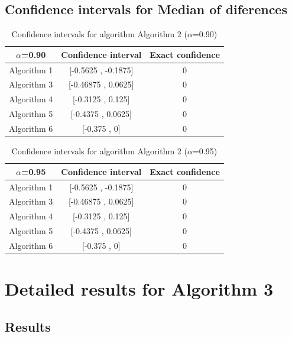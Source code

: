 \documentclass[a4paper,10pt]{article}
\begin{document}
\subsection{Confidence intervals for Median of diferences}

\begin{table}[!htp]
\centering\small
\begin{tabular}{
|c|c|c|}
\hline
 $\alpha$=0.90 & Confidence interval & Exact confidence \\ \hline 
Algorithm 1 & [-0.5625 , -0.1875] & 0\\ \hline 
Algorithm 3 & [-0.46875 , 0.0625] & 0\\ \hline 
Algorithm 4 & [-0.3125 , 0.125] & 0\\ \hline 
Algorithm 5 & [-0.4375 , 0.0625] & 0\\ \hline 
Algorithm 6 & [-0.375 , 0] & 0\\ \hline 

\end{tabular}
\caption{Confidence intervals for algorithm Algorithm 2 ($\alpha$=0.90)}
\end{table}
\begin{table}[!htp]
\centering\small
\begin{tabular}{
|c|c|c|}
\hline
 $\alpha$=0.95 & Confidence interval & Exact confidence \\ \hline 
Algorithm 1 & [-0.5625 , -0.1875] & 0\\ \hline 
Algorithm 3 & [-0.46875 , 0.0625] & 0\\ \hline 
Algorithm 4 & [-0.3125 , 0.125] & 0\\ \hline 
Algorithm 5 & [-0.4375 , 0.0625] & 0\\ \hline 
Algorithm 6 & [-0.375 , 0] & 0\\ \hline 

\end{tabular}
\caption{Confidence intervals for algorithm Algorithm 2 ($\alpha$=0.95)}
\end{table}

 \clearpage 


\section{Detailed results for Algorithm 3}


\subsection{Results}
\end{document}
